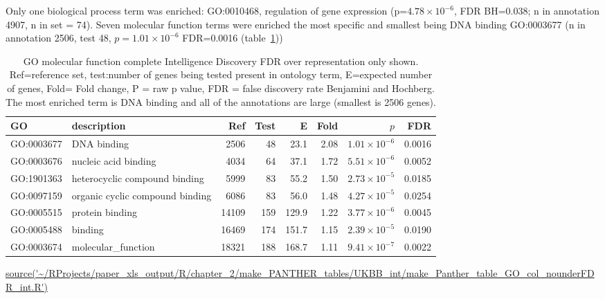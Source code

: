 Only one biological process term was enriched: GO:0010468, regulation of gene expression (p=$4.78\times10^{-6}$, FDR BH=0.038; n in annotation 4907, n in set = 74). 
Seven molecular function terms were enriched the most specific and smallest being DNA binding GO:0003677 (n in annotation 2506, test 48, $p=1.01\times10^{-6}$ FDR=0.0016 (table~\ref{tab:GO molecular function complete Intelligence Discovery FDRover represenation only}))


\begin{table}[ht]
\centering
 \setlength{\extrarowheight}{2pt}
\begin{adjustbox}{width=\textwidth}
\begin{tabular}{llrrrrrr}
  \toprule
GO & description & Ref & Test & E & Fold & $p$ & FDR \\ 
  \midrule
GO:0003677 & DNA binding  & 2506 & 48 & 23.1 & 2.08 & $1.01 \times 10^{-6}$ & 0.0016 \\ 
  GO:0003676 & nucleic acid binding  & 4034 & 64 & 37.1 & 1.72 & $5.51 \times 10^{-6}$ & 0.0052 \\ 
  GO:1901363 & heterocyclic compound binding  & 5999 & 83 & 55.2 & 1.50 & $2.73 \times 10^{-5}$ & 0.0185 \\ 
  GO:0097159 & organic cyclic compound binding  & 6086 & 83 & 56.0 & 1.48 & $4.27 \times 10^{-5}$ & 0.0254 \\ 
  GO:0005515 & protein binding  & 14109 & 159 & 129.9 & 1.22 & $3.77 \times 10^{-6}$ & 0.0045 \\ 
  GO:0005488 & binding  & 16469 & 174 & 151.7 & 1.15 & $2.39 \times 10^{-5}$ & 0.0190 \\ 
  GO:0003674 & molecular\_function  & 18321 & 188 & 168.7 & 1.11 & $9.41 \times 10^{-7}$ & 0.0022 \\ 
   \bottomrule
\end{tabular}
\end{adjustbox}
\caption[GO enrichment molecular function Intelligence Discovery]{GO molecular function complete Intelligence Discovery FDR over representation only shown.  Ref=reference set, test:number of genes being tested present in ontology term, E=expected number of genes, Fold= Fold change, P = raw p value, FDR = false discovery rate Benjamini and Hochberg. The most enriched term is DNA binding and all of the annotations are large (smallest is 2506 genes).}
\tiny\url{source('~/RProjects/paper_xls_output/R/chapter_2/make_PANTHER_tables/UKBB_int/make_Panther_table_GO_col_nounderFDR_int.R')} 
\label{tab:GO molecular function complete Intelligence Discovery FDRover represenation only}
\end{table}

